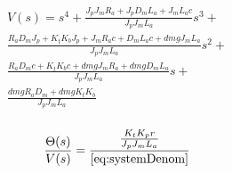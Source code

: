\documentclass[a4paper, 11pt, compsoc]{IEEEtran}
\begin{document}
            \begin{equation}
                \label{eq:systemDenom}
                \begin{aligned}
                    V(s) = s^4 + \frac{ J_pJ_mR_a + J_pD_mL_a + J_mL_ac }{J_pJ_mL_a}s^3 + \\
                    \frac{R_aD_mJ_p + K_tK_bJ_p + J_mR_ac + D_mL_ac + dmgJ_mL_a}{J_pJ_mL_a}s^2 + \\
                    \frac{R_aD_mc + K_tK_bc + dmgJ_mR_a + dmgD_mL_a}{J_pJ_mL_a}s + \\
                    \frac{dmgR_aD_m + dmgK_tK_b}{J_pJ_mL_a}\\
                \end{aligned}
            \end{equation}

            \begin{equation}
                \label{eq:fullTF}
                \begin{aligned}
                    \frac{\Theta(s)}{V(s)} = \frac{ \frac{K_tK_pr}{J_pJ_mL_a} }{ \cref{eq:systemDenom} }
                \end{aligned}
            \end{equation}
        
        
\end{document}
